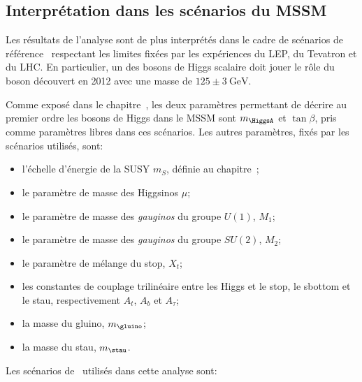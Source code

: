 \subsection{Interprétation dans les scénarios du MSSM}\label{chapter-HTT_analysis-section-signal_extraction-benchmarks}
Les résultats de l'analyse sont de plus interprétés dans le cadre de scénarios de référence~\cite{Bagnaschi_2019}
respectant les limites fixées par les expériences du LEP, du Tevatron et du LHC.
En particulier, un des bosons de Higgs scalaire doit jouer le rôle du boson découvert en 2012 avec une masse de $\num{125}\pm\SI{3}{\GeV}$.
\par
Comme exposé dans le chapitre~,
les deux paramètres permettant de décrire au premier ordre les bosons de Higgs dans le MSSM
sont $m_{\HiggsA}$ et $\tan\beta$,
pris comme paramètres libres dans ces scénarios.
Les autres paramètres, fixés par les scénarios utilisés, sont:
\begin{itemize}
\item l'échelle d'énergie de la SUSY $m_S$, définie au chapitre~;
\item le paramètre de masse des Higgsinos $\mu$;
\item le paramètre de masse des \emph{gauginos} du groupe $U(1)$, $M_1$;
\item le paramètre de masse des \emph{gauginos} du groupe $SU(2)$, $M_2$;
\item le paramètre de mélange du stop, $X_t$;
\item les constantes de couplage trilinéaire entre les Higgs et le stop, le sbottom et le stau, respectivement $A_t$, $A_b$ et $A_\tau$;
\item la masse du gluino, $m_{\gluino}$;
\item la masse du stau, $m_{\stau}$.
\end{itemize}
\par
Les scénarios de~\cite{Bagnaschi_2019} utilisés dans cette analyse sont:

%

